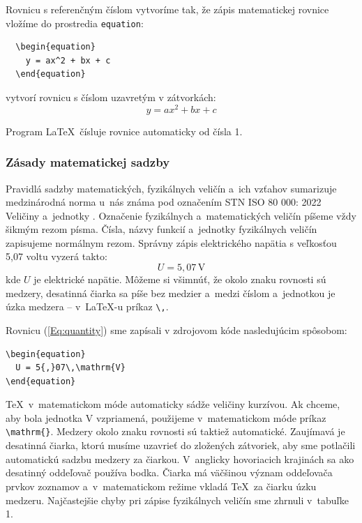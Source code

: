 \documentclass[../../../thesis.tex]{subfiles}
\begin{document}
Rovnicu s referenčným číslom vytvoríme tak, že zápis matematickej
rovnice vložíme do prostredia \verb|equation|:
\begin{verbatim}
  \begin{equation}
    y = ax^2 + bx + c
  \end{equation}
\end{verbatim}
vytvorí rovnicu s číslom uzavretým v zátvorkách:
\begin{equation}
  y = ax^2 + bx + c
\end{equation}

Program \LaTeX\ čísluje rovnice automaticky od čísla 1.

\subsubsection{Zásady matematickej sadzby}
Pravidlá sadzby matematických, fyzikálnych veličín a~ich vzťahov
sumarizuje medzinárodná norma u~nás známa pod označením
STN ISO 80 000: 2022 Veličiny a~jednotky \cite{iso800001, iso800002}.
Označenie fyzikálnych a~matematických veličín píšeme vždy
šikmým rezom písma.
Čísla, názvy funkcií a~jednotky fyzikálnych veličín zapisujeme
normálnym rezom.
Správny zápis elektrického napätia s veľkosťou 5,07 voltu
vyzerá takto:
\begin{equation}\label{Eq:quantity}
  U = 5{,}07\,\mathrm{V}
\end{equation}
kde $U$ je elektrické napätie.
Môžeme si všimnúť, že okolo znaku rovnosti sú medzery,
desatinná čiarka sa píše bez medzier a~medzi číslom a~jednotkou
je úzka medzera -- v~\LaTeX-u príkaz \verb|\,|.

Rovnicu (\ref{Eq:quantity}) sme zapísali v zdrojovom kóde nasledujúcim spôsobom:
\begin{verbatim}
\begin{equation}
  U = 5{,}07\,\mathrm{V}
\end{equation}
\end{verbatim}
\TeX\ v~matematickom móde automaticky sádže veličiny kurzívou.
Ak chceme, aby bola jednotka V vzpriamená, použijeme
v~matematickom móde príkaz \verb|\mathrm{}|. Medzery okolo znaku rovnosti sú taktiež automatické.
Zaujímavá je desatinná čiarka, ktorú musíme uzavrieť do
zložených zátvoriek, aby sme potlačili automatickú sadzbu
medzery za čiarkou.
V~anglicky hovoriacich krajinách sa ako desatinný oddeľovač
používa bodka.
Čiarka má väčšinou význam oddeľovača prvkov zoznamov
a~v~matematickom režime vkladá \TeX\, za čiarku úzku medzeru.
Najčastejšie chyby pri zápise fyzikálnych veličín sme zhrnuli
v~tabuľke 1.
\end{document}
